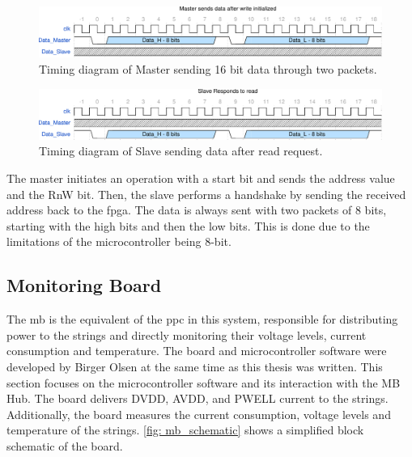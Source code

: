 \documentclass[main.tex]{subfiles}
\begin{document}
\begin{figure}[!htpb]
    \centering
    \includegraphics[width=15cm, scale=1]{images/MasterSendData-eps-converted-to.pdf}
    \caption{Timing diagram of Master sending 16 bit data through two packets.}
    \label{fig: master_send}
\end{figure}
\FloatBarrier

\begin{figure}[!htpb]
    \centering
    \includegraphics[width=15cm, scale=1]{images/SlaveRespondRead-eps-converted-to.pdf}
    \caption{Timing diagram of Slave sending data after read request.}
    \label{fig: slave_read}
\end{figure}
\FloatBarrier

The master initiates an operation with a start bit and sends the address value and the RnW bit. Then, the slave performs a handshake by sending the received address back to the \gls{fpga}. The data is always sent with two packets of 8 bits, starting with the high bits and then the low bits. This is done due to the limitations of the microcontroller being 8-bit. 


\subsection{Monitoring Board}
\label{ssec: microcontroller}
The \gls{mb} is the equivalent of the \gls{ppc} in this system, responsible for distributing power to the strings and directly monitoring their voltage levels, current consumption and temperature. The board and microcontroller software were developed by Birger Olsen at the same time as this thesis was written. This section focuses on the microcontroller software and its interaction with the MB Hub. The board delivers DVDD, AVDD, and PWELL current to the strings. Additionally, the board measures the current consumption, voltage levels and temperature of the strings. \autoref{fig: mb_schematic} shows a simplified block schematic of the board.
\end{document}
